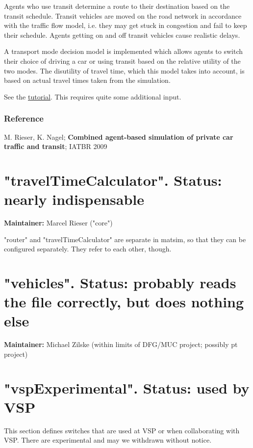 Agents who use transit determine a route to their destination based  on the transit schedule. Transit vehicles are moved on the road network  in accordance with the traffic flow model, i.e. they may get stuck in  congestion and fail to keep their schedule. Agents getting on and off  transit vehicles cause realistic delays.

A transport mode decision model is implemented which allows agents to  switch their choice of driving a car or using transit based on the  relative utility of the two modes. The disutility of travel time, which  this model takes into account, is based on actual travel times taken  from the simulation.

See the \href{http://matsim.org/docs/tutorials/transit}{tutorial}. This requires quite some additional input.

\subsubsection{Reference}

M. Rieser, K. Nagel; \textbf{Combined agent-based simulation of private car traffic and transit}; IATBR 2009

\vfill\eject
\section{"travelTimeCalculator". Status: nearly indispensable}

\textbf{Maintainer:} Marcel Rieser ("core")

"router" and "travelTimeCalculator" are separate in matsim, so that  they can be configured separately. They refer to each other,  though.

\vfill\eject
\section{"vehicles". Status: probably reads the file correctly, but does nothing else}

\textbf{Maintainer:} Michael Zilske (within limits of DFG/MUC project; possibly pt project)

\vfill\eject
\section{"vspExperimental". Status: used by VSP}

This  section defines switches that are used at VSP or when collaborating  with VSP. There are experimental and may we withdrawn without  notice.


